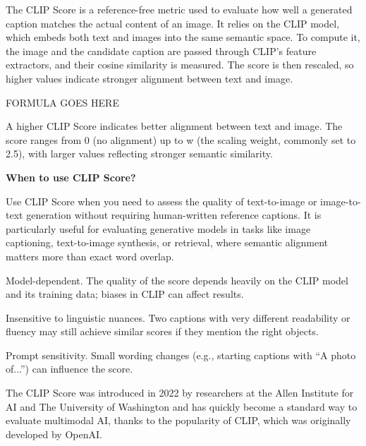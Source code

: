 
The CLIP Score is a reference-free metric used to evaluate how well a generated caption matches the
actual content of an image. It relies on the CLIP model, which embeds both text and images into the same semantic space. To compute it,
the image and the candidate caption are passed through CLIP’s feature extractors, and their cosine similarity is measured. The score is then
rescaled, so higher values indicate stronger alignment between text and image.

\begin{center}
    FORMULA GOES HERE
\end{center}

A higher CLIP Score indicates better alignment between text and image. The score ranges from 0 (no alignment) up to w (the scaling weight,
commonly set to 2.5), with larger values reflecting stronger semantic similarity.

\textbf{When to use CLIP Score?}

Use CLIP Score when you need to assess the quality of text-to-image or image-to-text generation without requiring human-written reference captions.
It is particularly useful for evaluating generative models in tasks like image captioning, text-to-image synthesis, or retrieval,
where semantic alignment matters more than exact word overlap.

{
\item Model-dependent. The quality of the score depends heavily on the CLIP model and its training data; biases in CLIP can affect results.
\item Insensitive to linguistic nuances. Two captions with very different readability or fluency may still achieve similar scores
if they mention the right objects.
\item Prompt sensitivity. Small wording changes (e.g., starting captions with “A photo of...”) can influence the score.
}

\clearpage

\thispagestyle{customstyle}

{The CLIP Score was introduced in 2022 by researchers at the Allen Institute for AI and The University of Washington and has quickly become a
standard way to evaluate multimodal AI, thanks to the popularity of CLIP, which was originally developed by OpenAI.}


